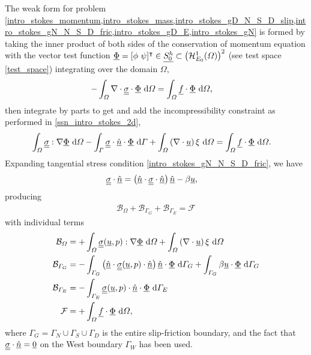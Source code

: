 The weak form for problem \cref{intro_stokes_momentum,intro_stokes_mass,intro_stokes_gD_N_S_D_slip,intro_stokes_gN_N_S_D_fric,intro_stokes_gD_E,intro_stokes_gN} is formed by taking the inner product of both sides of the conservation of momentum equation with the vector test function $\underline{\Phi} = [\phi\ \psi ]^\intercal \in \underline{S_0^h} \subset \left( \mathcal{H}_{E_0}^1(\varOmega) \right)^2$ (see test space \cref{test_space}) integrating over the domain $\Omega$,
\begin{align*}
  -\int_{\varOmega} \nabla \cdot \underline{\underline{\sigma}} \cdot \underline{\Phi} \ \mathrm{d}\varOmega &= \int_{\varOmega} \underline{f} \cdot \underline{\Phi} \ \mathrm{d}\varOmega,
\end{align*}
then integrate by parts to get and add the incompressibility constraint as performed in \cref{ssn_intro_stokes_2d},
{\footnotesize
\begin{align}
  \label{intro_stokes_slip_first_var_form}
  \int_{\varOmega} \underline{\underline{\sigma}} : \nabla \underline{\Phi} \ \mathrm{d}\varOmega - \int_{\varGamma} \underline{\underline{\sigma}} \cdot \underline{\hat{n}} \cdot \underline{\Phi} \ \mathrm{d}\varGamma + \int_{\varOmega} \left( \nabla \cdot \underline{u} \right) \xi \ \mathrm{d}\varOmega &= \int_{\varOmega} \underline{f} \cdot \underline{\Phi} \ \mathrm{d}\varOmega.
\end{align}}
Expanding tangential stress condition \cref{intro_stokes_gN_N_S_D_fric}, we have
\begin{align*}
  \underline{\underline{\sigma}} \cdot \underline{\hat{n}} &= \left( \underline{\hat{n}} \cdot \underline{\underline{\sigma}} \cdot \underline{\hat{n}} \right) \underline{\hat{n}} - \beta \underline{u},
\end{align*}
producing
\begin{align}
  \label{intro_stokes_slip_intermediate_var_form}
  \mathcal{B}_{\Omega} + \mathcal{B}_{\Gamma_G} + \mathcal{B}_{\Gamma_E} = \mathcal{F}
\end{align}
with individual terms
\begin{align*}
  \mathcal{B}_{\varOmega} &= + \int_{\varOmega} \underline{\underline{\sigma}}(\underline{u},p) : \nabla \underline{\Phi} \ \mathrm{d}\varOmega + \int_{\varOmega} \left( \nabla \cdot \underline{u} \right) \xi \ \mathrm{d}\varOmega \\
  \mathcal{B}_{\varGamma_G} &= - \int_{\varGamma_G} \left( \underline{\hat{n}} \cdot \underline{\underline{\sigma}}(\underline{u},p) \cdot \underline{\hat{n}} \right) \underline{\hat{n}} \cdot \underline{\Phi} \ \mathrm{d}\varGamma_G + \int_{\varGamma_G} \beta \underline{u} \cdot \underline{\Phi} \ \mathrm{d}\varGamma_G \\
  \mathcal{B}_{\varGamma_E} &= - \int_{\varGamma_E} \underline{\underline{\sigma}}(\underline{u},p) \cdot \underline{\hat{n}} \cdot \underline{\Phi} \ \mathrm{d}\varGamma_E \\
  \mathcal{F} &= + \int_{\varOmega} \underline{f} \cdot \underline{\Phi} \ \mathrm{d}\varOmega, 
\end{align*}
where $\Gamma_G = \Gamma_N \cup \Gamma_S \cup \Gamma_D$ is the entire slip-friction boundary, and the fact that $\underline{\underline{\sigma}} \cdot \underline{\hat{n}} = \underline{0}$ on the West boundary $\Gamma_W$ has been used.

